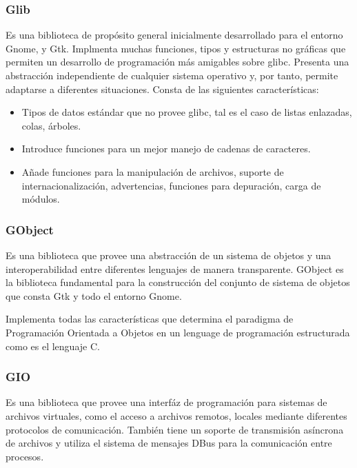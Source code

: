 \documentclass[letterpaper,10pt]{article}
\begin{document}
\subsubsection{Glib}
Es una biblioteca de propósito general inicialmente desarrollado para el entorno Gnome, y Gtk.
Implmenta muchas funciones, tipos y estructuras no gráficas que permiten un desarrollo de programación
más amigables sobre glibc.
Presenta una abstracción independiente de cualquier sistema operativo y, por tanto, permite adaptarse
a diferentes situaciones. Consta de las siguientes características:
\begin{itemize}
  \item Tipos de datos estándar que no provee glibc, tal es el caso de listas enlazadas, colas, árboles.
  \item Introduce funciones para un mejor manejo de cadenas de caracteres.
  \item Añade funciones para la manipulación de archivos, suporte de internacionalización,
    advertencias, funciones para depuración, carga de módulos.
\end{itemize}

\subsubsection{GObject}
Es una biblioteca que provee una abstracción de un sistema de objetos y una interoperabilidad entre
diferentes lenguajes de manera transparente.
GObject es la biblioteca fundamental para la construcción del conjunto de sistema de objetos que consta
Gtk y todo el entorno Gnome. 

Implementa todas las características que determina el paradigma de Programación Orientada a Objetos
en un lenguage de programación estructurada como es el lenguaje C.

\subsubsection{GIO}
Es una biblioteca que provee una interfáz de programación para sistemas de archivos virtuales, como 
el acceso a archivos remotos, locales mediante diferentes protocolos de comunicación.
También tiene un soporte de transmisión asíncrona de archivos y utiliza el sistema de mensajes
DBus para la comunicación entre procesos.
\end{document}
